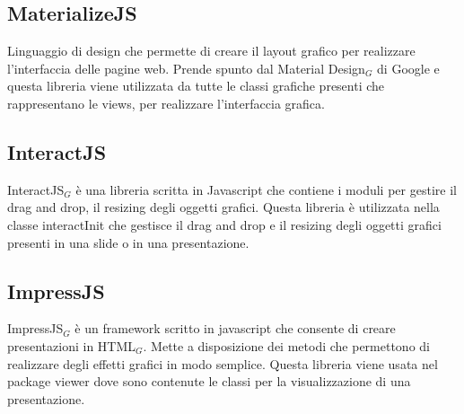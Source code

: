 \subsection{MaterializeJS}

Linguaggio di design che permette di creare il layout grafico per realizzare l'interfaccia delle pagine web. Prende spunto dal Material Design$_G$ di Google e questa libreria viene utilizzata da tutte le classi grafiche presenti che rappresentano le views, per realizzare l'interfaccia grafica. 

\subsection{InteractJS}

InteractJS$_G$ è una libreria scritta in Javascript che contiene i moduli per gestire il drag and drop, il resizing degli oggetti grafici.
Questa libreria è utilizzata nella classe interactInit che gestisce il drag and drop e il resizing degli oggetti grafici presenti in una slide o in una presentazione.

\subsection{ImpressJS}

ImpressJS$_G$ è un framework scritto in javascript che consente di creare presentazioni in HTML$_G$. Mette a disposizione dei metodi che permettono di realizzare degli effetti grafici in modo semplice. Questa libreria viene usata nel package viewer dove sono contenute le classi per la visualizzazione di una presentazione. 


